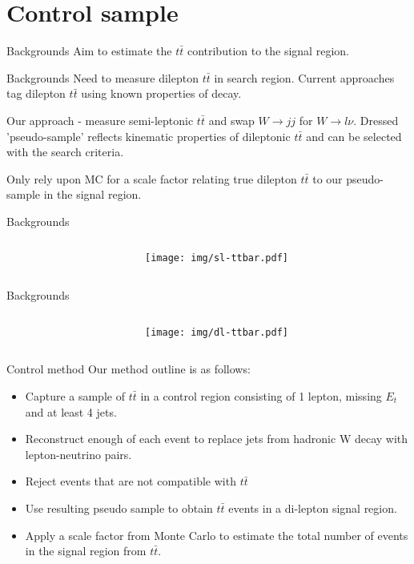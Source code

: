 \documentclass{beamer}
\begin{document}
\section{Control sample}
\begin{frame}{Backgrounds}
Aim to estimate the $t\bar{t}$ contribution to the signal region.
\end{frame}

\begin{frame}{Backgrounds}
Need to measure dilepton $t\bar{t}$ in search region. Current approaches tag dilepton $t\bar{t}$ using known properties of decay.

Our approach - measure semi-leptonic $t\bar{t}$ and swap $W\rightarrow jj$ for $W\rightarrow l\nu$. Dressed 'pseudo-sample' reflects kinematic properties of dileptonic $t\bar{t}$ and can be selected with the search criteria.

Only rely upon MC for a scale factor relating true dilepton $t\bar{t}$ to our pseudo-sample in the signal region.
\end{frame}

\begin{frame}{Backgrounds}
\begin{columns}
  \begin{column}{0.1\textwidth}
  \end{column}
  \begin{column}{0.8\textwidth}
    \texttt{[image: img/sl-ttbar.pdf]}
  \end{column}
\end{columns}
\end{frame}

\begin{frame}{Backgrounds}
\begin{columns}
  \begin{column}{0.1\textwidth}
  \end{column}
  \begin{column}{0.8\textwidth}
    \texttt{[image: img/dl-ttbar.pdf]}
  \end{column}
\end{columns}
\end{frame}

\begin{frame}{Control method}
Our method outline is as follows:
  \begin{itemize}
    \item Capture a sample of $t \bar{t}$ in a control region consisting of 1 lepton, missing $E_{t}$ and at least 4 jets.
    \item Reconstruct enough of each event to replace jets from hadronic W decay with lepton-neutrino pairs.
    \item Reject events that are not compatible with $t \bar{t}$
    \item Use resulting pseudo sample to obtain $t \bar{t}$ events in a di-lepton signal region.
    \item Apply a scale factor from Monte Carlo to estimate the total number of events in the signal region from $t \bar{t}$.
  \end{itemize}
\end{frame}
\end{document}
